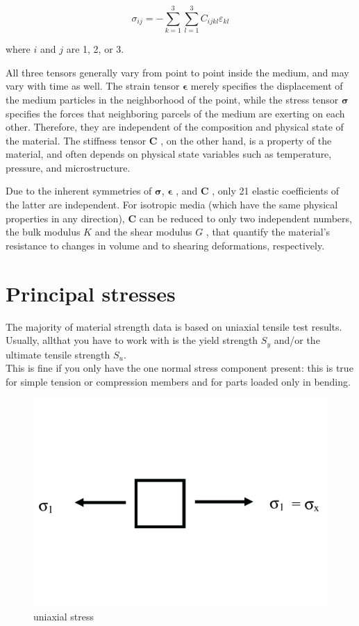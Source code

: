 \begin{equation}
\sigma_{ij} = -\sum_{k=1}^{3} \sum_{l=1}^{3} C_{ijkl} \varepsilon_{kl}
\end{equation}

where $ i $ and $ j $ are 1, 2, or 3.

All three tensors generally vary from point to point inside the medium, and may vary with time as well. The strain tensor $ \mathbf{\epsilon} $  merely specifies the displacement of the medium particles in the neighborhood of the point, while the stress tensor $ \mathbf{\sigma} $  specifies the forces that neighboring parcels of the medium are exerting on each other. Therefore, they are independent of the composition and physical state of the material. The stiffness tensor $ \mathbf{C} $ , on the other hand, is a property of the material, and often depends on physical state variables such as temperature, pressure, and microstructure.

Due to the inherent symmetries of $ \mathbf{\sigma} $, $ \mathbf{\epsilon} $ , and $ \mathbf{C} $ , only 21 elastic coefficients of the latter are independent. For isotropic media (which have the same physical properties in any direction), $ \mathbf{C} $ can be reduced to only two independent numbers, the bulk modulus $ K $ and the shear modulus $ G $ , that quantify the material's resistance to changes in volume and to shearing deformations, respectively.

\section{Principal stresses}
The majority of material strength data is based on uniaxial tensile test results. Usually, allthat you have to work with is the yield strength $ S_y $ and/or the ultimate tensile strength $ S_u $. \\

This is fine if you only have the one normal stress component present: this is true for simple tension or compression members and for parts loaded only in bending.

\begin{figure}[h!]
	\centering
	\includegraphics[width=0.3\linewidth]{figures/uniaxial_stress}
	\caption{uniaxial stress}
	\label{fig:uniaxialstress}
\end{figure}


